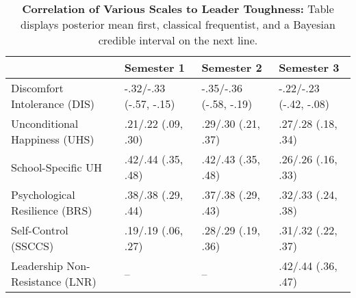 \begin{table}[ht]
\centering
\begin{tabular}{llll}
  \hline
 & Semester 1 & Semester 2 & Semester 3 \\ 
  \hline
Discomfort Intolerance (DIS) & -.32/-.33 (-.57, -.15) & -.35/-.36 (-.58, -.19) & -.22/-.23 (-.42, -.08) \\ 
  Unconditional Happiness (UHS) & .21/.22 (.09, .30) & .29/.30 (.21, .37) & .27/.28 (.18, .34) \\ 
  School-Specific UH & .42/.44 (.35, .48) & .42/.43 (.35, .48) & .26/.26 (.16, .33) \\ 
  Psychological Resilience (BRS) & .38/.38 (.29, .44) & .37/.38 (.29, .43) & .32/.33 (.24, .38) \\ 
  Self-Control (SSCCS) & .19/.19 (.06, .27) & .28/.29 (.19, .36) & .31/.32 (.22, .37) \\ 
  Leadership Non-Resistance (LNR) & -- & -- & .42/.44 (.36, .47) \\ 
   \hline
\end{tabular}
\caption{\textbf{Correlation of Various Scales to Leader Toughness:} Table displays posterior mean first, classical frequentist, and a Bayesian credible interval on the next line.} 
\label{tab:edc_corr}
\end{table}
